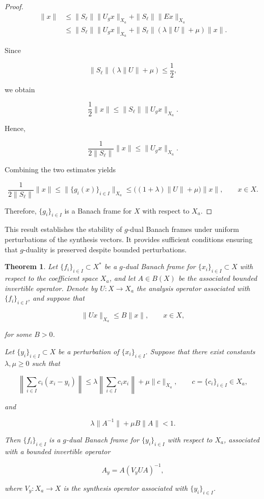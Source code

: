 \documentclass[12pt]{article}
\newtheorem{theorem}{Theorem}[section]
\theoremstyle{definition}
\theoremstyle{remark}
\begin{document}
\begin{proof}
	$$
	\begin{aligned}
		\|x\|
		&\leq
		\|S_\ell\|\|U_gx\|_{X_a}
		+\|S_\ell\|\|Ex\|_{X_a}\\
		&\leq
		\|S_\ell\|\|U_gx\|_{X_a}
		+\|S_\ell\|(\lambda\|U\|+\mu)\|x\|.
	\end{aligned}
	$$
	
	Since
	
	$$
	\|S_\ell\|(\lambda\|U\|+\mu)\leq\frac12,
	$$
	
	we obtain
	
	$$
	\frac12\|x\|
	\leq
	\|S_\ell\|\|U_gx\|_{X_a}.
	$$
	
	Hence,
	
	$$
	\frac{1}{2\|S_\ell\|}\|x\|
	\leq
	\|U_gx\|_{X_a}.
	$$
	
	Combining the two estimates yields
	
	$$
	\frac{1}{2\|S_\ell\|}\|x\|
	\leq
	\|\{g_i(x)\}_{i\in I}\|_{X_a}
	\leq
	\bigl((1+\lambda)\|U\|+\mu\bigr)\|x\|,
	\qquad x\in X.
	$$
	
	Therefore, \(\{g_i\}_{i\in I}\) is a Banach frame for \(X\) with respect
	to \(X_a\).
\end{proof}



This result establishes the stability of \(g\)-dual Banach frames under
uniform perturbations of the synthesis vectors. It provides sufficient
conditions ensuring that \(g\)-duality is preserved despite bounded
perturbations.


\begin{theorem}
	Let \(\{f_i\}_{i\in I}\subset X^*\) be a \(g\)-dual Banach frame for
	\(\{x_i\}_{i\in I}\subset X\) with respect to the coefficient space
	\(X_a\), and let \(A\in B(X)\) be the associated bounded invertible
	operator. Denote by \(U:X\to X_a\) the analysis operator associated with
	\(\{f_i\}_{i\in I}\), and suppose that
	
	$$
	\|Ux\|_{X_a}\leq B\|x\|,
	\qquad x\in X,
	$$
	
	for some \(B>0\).
	
	Let \(\{y_i\}_{i\in I}\subset X\) be a perturbation of
	\(\{x_i\}_{i\in I}\). Suppose that there exist constants
	\(\lambda,\mu\geq0\) such that
	
	$$
	\left\|
	\sum_{i\in I}c_i(x_i-y_i)
	\right\|
	\leq
	\lambda
	\left\|
	\sum_{i\in I}c_i x_i
	\right\|
	+\mu\|c\|_{X_a},
	\qquad c=\{c_i\}_{i\in I}\in X_a,
	$$
	
	and
	
	$$
	\lambda\|A^{-1}\|+\mu B\|A\|<1.
	$$
	
	Then \(\{f_i\}_{i\in I}\) is a \(g\)-dual Banach frame for
	\(\{y_i\}_{i\in I}\) with respect to \(X_a\), associated with a bounded
	invertible operator
	
	$$
	A_y=A(V_yUA)^{-1},
	$$
	
	where \(V_y:X_a\to X\) is the synthesis operator associated with
	\(\{y_i\}_{i\in I}\).
\end{theorem}
\end{document}
